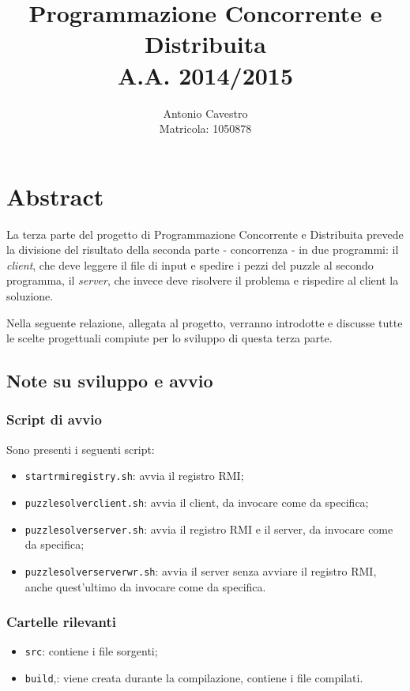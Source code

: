 \documentclass[a4paper, 12pt]{article}
\title{Programmazione Concorrente e Distribuita \\ A.A. 2014/2015 \\
\vspace{2 mm}{\small PuzzleSolver - Parte 3}}
\author{Antonio Cavestro \\ \vspace{2 mm} {\small Matricola: 1050878}}
\date{}
\begin{document}
\maketitle

\section{Abstract}

La terza parte del progetto di Programmazione Concorrente e Distribuita
prevede la divisione del risultato della seconda parte - concorrenza - in due
programmi: il \emph{client}, che deve leggere il file di input e spedire i pezzi
del puzzle al secondo programma, il \emph{server}, che invece deve risolvere
il problema e rispedire al client la soluzione.

Nella seguente relazione, allegata al progetto, verranno introdotte e discusse
tutte le scelte progettuali compiute per lo sviluppo di questa terza parte.

\subsection{Note su sviluppo e avvio}
\subsubsection{Script di avvio}
Sono presenti i seguenti script:
\begin{itemize}
\item \verb|startrmiregistry.sh|: avvia il registro RMI;
\item \verb|puzzlesolverclient.sh|: avvia il client, da invocare come da
specifica;
\item \verb|puzzlesolverserver.sh|: avvia il registro RMI e il server, da
invocare come da specifica;
\item \verb|puzzlesolverserverwr.sh|: avvia il server senza avviare il registro
RMI, anche quest'ultimo da invocare come da specifica.
\end{itemize}
\subsubsection{Cartelle rilevanti}
\begin{itemize}
\item \verb|src|: contiene i file sorgenti;
\item \verb|build|,: viene creata durante la compilazione, contiene i file
compilati.
\end{itemize}
\end{document}
